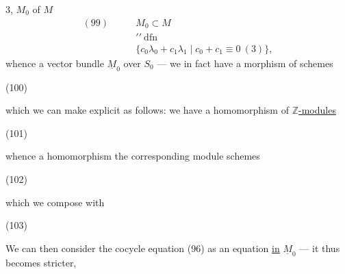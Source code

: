 
$3$, $M_0$ of $M$
\[
\begin{aligned}
(99)\qquad&M_0\subset M\\[-2pt]
&\prime\prime\ \mathrm{dfn}\\[-2pt]
&\{c_0\lambda_0+c_1\lambda_1\mid c_0+c_1\equiv0\ (3)\},
\end{aligned}
\]
whence a vector bundle $\underline M_0$ over $S_0$ ---
we in fact have a morphism of schemes

\begin{samepage}
(100)
\end{samepage}
which we can make explicit as follows: we have a homomorphism of \uline{$\mathbb Z$-modules}

\begin{samepage}
(101)
\end{samepage}
whence a homomorphism  the corresponding module schemes

\begin{samepage}
(102)
\end{samepage}
which we compose with

\begin{samepage}
(103)
\end{samepage}
We can then consider the cocycle equation (96) as an equation \uline{in}
$\underline M_0$ --- it thus becomes stricter,

